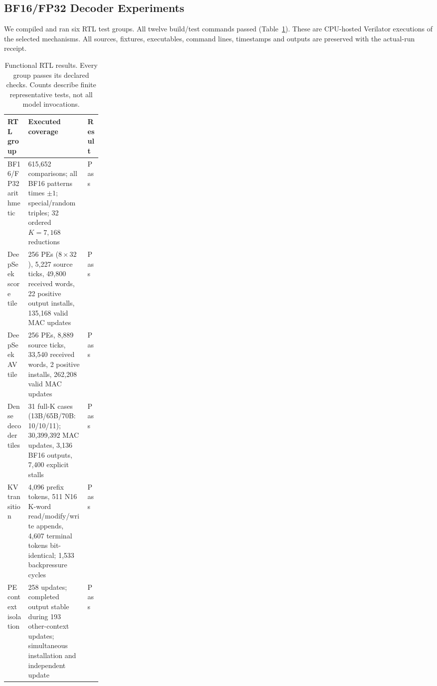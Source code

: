 \subsection{BF16/FP32 Decoder Experiments}
\label{app:wo24_decoder_rtl}
We compiled and ran six RTL test groups.
All twelve build/test commands passed (Table~\ref{tab:wo24_rtl}).
These are CPU-hosted Verilator executions of the selected mechanisms.
All sources, fixtures, executables, command lines, timestamps and outputs are preserved with the actual-run receipt.

\begin{table}[htbp]
\centering\small
\caption{Functional RTL results. Every group passes its declared checks.
Counts describe finite representative tests, not all model invocations.}
\label{tab:wo24_rtl}
\begin{tabularx}{\linewidth}{@{}p{0.22\linewidth}Xl@{}}
\toprule
RTL group & Executed coverage & Result \\
\midrule
BF16/FP32 arithmetic & 615,652 comparisons; all BF16 patterns times
$\pm1$; special/random triples; 32 ordered $K=7,168$ reductions & Pass \\
DeepSeek score tile & 256 PEs ($8\!\times\!32$), 5,227 source ticks,
49,800 received words, 22 positive output installs,
135,168 valid MAC updates & Pass \\
DeepSeek AV tile & 256 PEs, 8,889 source ticks, 33,540 received words,
2 positive installs, 262,208 valid MAC updates & Pass \\
Dense decoder tiles & 31 full-K cases (13B/65B/70B: 10/10/11);
30,399,392 MAC updates, 3,136 BF16 outputs, 7,400 explicit stalls & Pass \\
KV transition & 4,096 prefix tokens, 511 N16 K-word read/modify/write
appends, 4,607 terminal tokens bit-identical; 1,533 backpressure cycles & Pass \\
PE context isolation & 258 updates; completed output stable during
193 other-context updates; simultaneous installation and independent update & Pass \\
\bottomrule
\end{tabularx}
\end{table}

